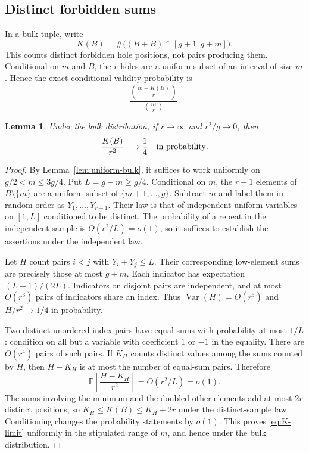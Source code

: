 \documentclass[11pt]{article}
\newtheorem{lemma}[theorem]{Lemma}
\theoremstyle{remark}\newtheorem{remark}[theorem]{Remark}
\begin{document}
\subsection{Distinct forbidden sums}

In a bulk tuple, write
\[
K(B)=\#\bigl((B+B)\cap[g+1,g+m]\bigr).
\]
This counts distinct forbidden hole positions, not pairs producing them.
Conditional on $m$ and $B$, the $r$ holes are a uniform subset of an
interval of size $m$. Hence the exact conditional validity probability is
\begin{equation}\label{eq:avoidance}
\frac{\binom{m-K(B)}r}{\binom mr}.
\end{equation}

\begin{lemma}\label{lem:forbidden-sums}
Under the bulk distribution, if $r\to\infty$ and $r^2/g\to0$, then
\begin{equation}\label{eq:K-limit}
\frac{K(B)}{r^2}\longrightarrow\frac14
\quad\hbox{in probability}.
\end{equation}
\end{lemma}

\begin{proof}
By Lemma~\ref{lem:uniform-bulk}, it suffices to work uniformly on
$g/2<m\le3g/4$. Put $L=g-m\ge g/4$. Conditional on $m$, the
$r-1$ elements of $B\setminus\{m\}$ are a uniform subset of
$\{m+1,\ldots,g\}$. Subtract $m$ and label them in random order as
$Y_1,\ldots,Y_{r-1}$. Their law is that of independent uniform
variables on $[1,L]$ conditioned to be distinct. The probability of a
repeat in the independent sample is $O(r^2/L)=o(1)$, so it suffices
to establish the assertions under the independent law.

Let $H$ count pairs $i<j$ with $Y_i+Y_j\le L$. Their corresponding
low-element sums are precisely those at most $g+m$. Each indicator
has expectation $(L-1)/(2L)$. Indicators on disjoint pairs are
independent, and at most $O(r^3)$ pairs of indicators share an index.
Thus $\operatorname{Var}(H)=O(r^3)$ and
$H/r^2\to1/4$ in probability.

Two distinct unordered index pairs have equal sums with probability at
most $1/L$: condition on all but a variable with coefficient $1$ or
$-1$ in the equality. There are $O(r^4)$ pairs of such pairs. If
$K_H$ counts distinct values among the sums counted by $H$, then
$H-K_H$ is at most the number of equal-sum pairs. Therefore
\[
\mathbb E\left[\frac{H-K_H}{r^2}\right]=O(r^2/L)=o(1).
\]
The sums involving the minimum and the doubled other elements add at
most $2r$ distinct positions, so $K_H\le K(B)\le K_H+2r$ under the
distinct-sample law. Conditioning changes the probability statements
by $o(1)$. This proves \eqref{eq:K-limit} uniformly in the stipulated
range of $m$, and hence under the bulk distribution.
\end{proof}
\end{document}
